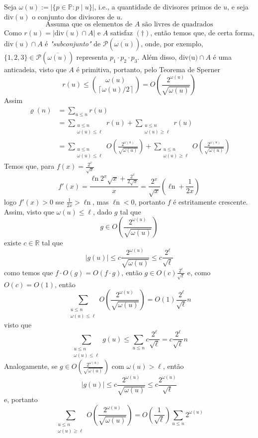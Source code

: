 \documentclass[11pt]{article}
\newcommand{\mc}[1]{\mathcal{#1}}
\newcommand{\mbb}[1]{\mathbb{#1}}
\newcommand{\ol}[1]{\overline{#1}}
\newcommand{\rp}[1]{{\left(#1\right)}}
\newcommand\ceil[1]{{\left\lceil#1\right\rceil}}
\renewcommand{\ln}[1]{{\mathop{\ell n\rp{#1}}}}
\begin{document}
Seja $\omega(u):=|\{p\in\mbb{P}:p\mid u\}|$, i.e., a quantidade de divisores primos de $u$, e seja $\text{div}(u)$ o conjunto dos divisores de $u$.
\begin{equation}
    \text{Assuma que os elementos de $A$ são livres de quadrados}\tag{$\dagger$}
\end{equation}
Como $r(u)=|\text{div}(u)\cap A|$ e $A$ satisfaz $(\dagger)$, então temos que, de certa forma, $\text{div}(u)\cap A$ é \textit{"subconjunto"} de $\mc{P}(\ol{\omega(u)})$, onde, por exemplo, $\{1,2,3\}\in\mc{P}(\ol{\omega(u)})$ representa $p_1\cdot p_2\cdot p_3$. Além disso, $\text{div(u)}\cap A$ é uma anticadeia, visto que $A$ é primitiva, portanto, pelo Teorema de Sperner
$$r(u)\leq\binom{\omega(u)}{\ceil{\omega(u)/2}}=O\rp{\frac{2^{\omega(u)}}{\sqrt{\omega(u)}}}$$
Assim
\begin{align*}
    \varrho(n) & = \sum_{u\leq n}r(u)\\
    & = \sum_{\substack{u\leq n\\\omega(u)\leq\ell}}r(u) + \sum_{\substack{u\leq n\\\omega(u)\geq\ell}}r(u)\\
    & = \sum_{\substack{u\leq n\\\omega(u)\leq\ell}}O\rp{\frac{2^{\omega(u)}}{\sqrt{\omega(u)}}} + \sum_{\substack{u\leq n\\\omega(u)\geq\ell}}O\rp{\frac{2^{\omega(u)}}{\sqrt{\omega(u)}}}
\end{align*}
Temos que, para $f(x)=\frac{2^x}{\sqrt{x}}$
$$f'(x)=\frac{\ln{2}2^x\sqrt{x}+\frac{2^x}{2\sqrt{x}}}{x}=\frac{2^x}{\sqrt{x}}\rp{\ln{2}+\frac{1}{2x}}$$
logo $f'(x)>0$ sse $\frac{1}{2x}>\ln{\frac12}$, mas $\ln{\frac12}<0$, portanto $f$ é estritamente crescente. Assim, visto que $\omega(u)\leq\ell$, dado $g$ tal que
$$g\in O\rp{\frac{2^{\omega(u)}}{\sqrt{\omega(u)}}}$$
existe $c\in\mbb{R}$ tal que
$$|g(u)|\leq c\frac{2^{\omega(u)}}{\sqrt{\omega(u)}}\leq c\frac{2^\ell}{\sqrt{\ell}}$$
como temos que $f\cdot O(g)=O(f\cdot g)$, então $g\in O(c)\frac{2^\ell}{\sqrt{\ell}}$ e, como $O(c)=O(1)$, então
$$\sum_{\substack{u\leq n\\\omega(u)\leq\ell}}O\rp{\frac{2^{\omega(u)}}{\sqrt{\omega(u)}}}=O(1)\frac{2^\ell}{\sqrt{\ell}}n$$
visto que
$$\sum_{\substack{u\leq n\\\omega(u)\leq\ell}}g(u)\leq\sum_{u\leq n}c\frac{2^\ell}{\sqrt{\ell}}=c\frac{2^\ell}{\sqrt{\ell}}n$$
Analogamente, se $g\in O\rp{\frac{2^{\omega(u)}}{\sqrt{\omega(u)}}}$ com $\omega(u)>\ell$, então
$$|g(u)|\leq c\frac{2^{\omega(u)}}{\sqrt{\omega(u)}}\leq c\frac{2^{\omega(u)}}{\sqrt{\ell}}$$
e, portanto
$$\sum_{\substack{u\leq n\\\omega(u)\geq\ell}}O\rp{\frac{2^{\omega(u)}}{\sqrt{\omega(u)}}}=O\rp{\frac{1}{\sqrt{\ell}}}\sum_{u\leq n}2^{\omega(u)}$$
\end{document}
